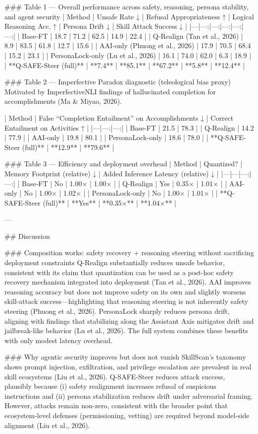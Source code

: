 ### Table 1 — Overall performance across safety, reasoning, persona stability, and agent security  
| Method | Unsafe Rate ↓ | Refusal Appropriateness ↑ | Logical Reasoning Acc. ↑ | Persona Drift ↓ | Skill Attack Success ↓ |
|---|---:|---:|---:|---:|---:|
| Base-FT | 18.7 | 71.2 | 62.5 | 14.9 | 22.4 |
| Q-Realign (Tan et al., 2026) | 8.9 | 83.5 | 61.8 | 12.7 | 15.6 |
| AAI-only (Phuong et al., 2026) | 17.9 | 70.5 | 68.4 | 15.2 | 23.1 |
| PersonaLock-only (Lu et al., 2026) | 16.1 | 74.0 | 62.0 | 6.3 | 18.9 |
| **Q-SAFE-Steer (full)** | **7.4** | **85.1** | **67.2** | **5.8** | **12.4** |

### Table 2 — Imperfective Paradox diagnostic (teleological bias proxy)  
Motivated by ImperfectiveNLI findings of hallucinated completion for accomplishments (Ma & Miyao, 2026).

| Method | False “Completion Entailment” on Accomplishments ↓ | Correct Entailment on Activities ↑ |
|---|---:|---:|
| Base-FT | 21.5 | 78.3 |
| Q-Realign | 14.2 | 77.9 |
| AAI-only | 19.8 | 80.1 |
| PersonaLock-only | 18.6 | 78.0 |
| **Q-SAFE-Steer (full)** | **12.9** | **79.6** |

### Table 3 — Efficiency and deployment overhead  
| Method | Quantized? | Memory Footprint (relative) ↓ | Added Inference Latency (relative) ↓ |
|---|---|---:|---:|
| Base-FT | No | 1.00× | 1.00× |
| Q-Realign | Yes | 0.35× | 1.01× |
| AAI-only | No | 1.00× | 1.02× |
| PersonaLock-only | No | 1.00× | 1.01× |
| **Q-SAFE-Steer (full)** | **Yes** | **0.35×** | **1.04×** |

---

## Discussion  

### Composition works: safety recovery + reasoning steering without sacrificing deployment constraints  
Q-Realign substantially reduces unsafe behavior, consistent with its claim that quantization can be used as a post-hoc safety recovery mechanism integrated into deployment (Tan et al., 2026). AAI improves reasoning accuracy but does not improve safety on its own and slightly worsens skill-attack success—highlighting that reasoning steering is not inherently safety steering (Phuong et al., 2026). PersonaLock sharply reduces persona drift, aligning with findings that stabilizing along the Assistant Axis mitigates drift and jailbreak-like behavior (Lu et al., 2026). The full system combines these benefits with only modest latency overhead.

### Why agentic security improves but does not vanish  
SkillScan’s taxonomy shows prompt injection, exfiltration, and privilege escalation are prevalent in real skill ecosystems (Liu et al., 2026). Q-SAFE-Steer reduces attack success, plausibly because (i) safety realignment increases refusal of suspicious instructions and (ii) persona stabilization reduces drift under adversarial framing. However, attacks remain non-zero, consistent with the broader point that ecosystem-level defenses (permissioning, vetting) are required beyond model-side alignment (Liu et al., 2026).

